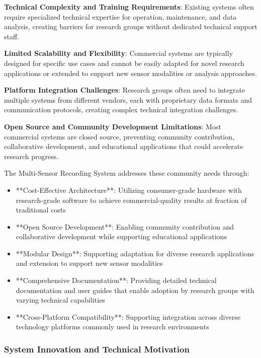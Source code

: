 \documentclass[11pt,a4paper]{report}
\begin{document}
\textbf{Technical Complexity and Training Requirements}: Existing systems often require specialized technical expertise for
operation, maintenance, and data analysis, creating barriers for research groups without dedicated technical support
staff.

\textbf{Limited Scalability and Flexibility}: Commercial systems are typically designed for specific use cases and cannot be
easily adapted for novel research applications or extended to support new sensor modalities or analysis approaches.

\textbf{Platform Integration Challenges}: Research groups often need to integrate multiple systems from different vendors,
each with proprietary data formats and communication protocols, creating complex technical integration challenges.

\textbf{Open Source and Community Development Limitations}: Most commercial systems are closed source, preventing community
contribution, collaborative development, and educational applications that could accelerate research progress.

The Multi-Sensor Recording System addresses these community needs through:

\begin{itemize}
\item **Cost-Effective Architecture**: Utilizing consumer-grade hardware with research-grade software to achieve
  commercial-quality results at fraction of traditional costs
\item **Open Source Development**: Enabling community contribution and collaborative development while supporting
  educational applications
\item **Modular Design**: Supporting adaptation for diverse research applications and extension to support new sensor
  modalities
\item **Comprehensive Documentation**: Providing detailed technical documentation and user guides that enable adoption by
  research groups with varying technical capabilities
\item **Cross-Platform Compatibility**: Supporting integration across diverse technology platforms commonly used in research
  environments

\end{itemize}
\subsubsection{System Innovation and Technical Motivation}
\end{document}
